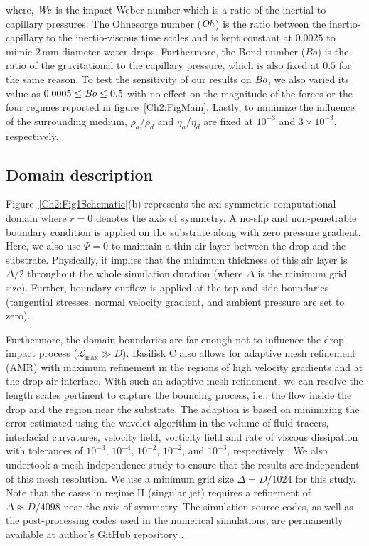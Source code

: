 \begin{subappendices}
	where, $\mathit{We}$ is the impact Weber number which is a ratio of the inertial to capillary pressures. The Ohnesorge number ($\mathit{Oh}$) is the ratio between the inertio-capillary to the inertio-viscous time scales and is kept constant at $0.0025$ to mimic $2\,\si{\milli\meter}$ diameter water drops. Furthermore, the Bond number ($Bo$) is the ratio of the gravitational to the capillary pressure, which is also fixed at $0.5$ for the same reason. To test the sensitivity of our results on $\mathit{Bo}$, we also varied its value as $0.0005 \le \mathit{Bo} \le  0.5$ with no effect on the magnitude of the forces or the four regimes reported in figure~\ref{Ch2:FigMain}. Lastly, to minimize the influence of the surrounding medium, $\rho_a/\rho_d$ and $\eta_a/\eta_d$ are fixed at $10^{-3}$ and $3 \times 10^{-3}$, respectively. 
	
	\subsection{Domain description}
	
	Figure~\ref{Ch2:Fig1Schematic}(b) represents the axi-symmetric computational domain where $r = 0$ denotes the axis of symmetry. A no-slip and non-penetrable boundary condition is applied on the substrate along with zero pressure gradient. Here, we also use $\Psi = 0$ to maintain a thin air layer between the drop and the substrate. Physically, it implies that the minimum thickness of this air layer is $\Delta/2$ throughout the whole simulation duration (where $\Delta$ is the minimum grid size). Further, boundary outflow is applied at the top and side boundaries (tangential stresses, normal velocity gradient, and ambient pressure are set to zero). 
	
	Furthermore, the domain boundaries are far enough not to influence the drop impact process ($\mathcal{L}_{\text{max}} \gg D$). Basilisk C \cite{basiliskpopinet1} also allows for adaptive mesh refinement (AMR) with maximum refinement in the regions of high velocity gradients and at the drop-air interface. With such an adaptive mesh refinement, we can resolve the length scales pertinent to capture the bouncing process, i.e., the flow inside the drop and the region near the substrate. The adaption is based on minimizing the error estimated using the wavelet algorithm \citep{popinet2015quadtree} in the volume of fluid tracers, interfacial curvatures, velocity field, vorticity field and rate of viscous dissipation with tolerances of $10^{-3}$, $10^{-4}$, $10^{-2}$, $10^{-2}$, and $10^{-3}$, respectively  \citep{basiliskvatsaltwopeaks}. We also undertook a mesh independence study to ensure that the results are independent of this mesh resolution. We use a minimum grid size $\Delta = D/1024$ for this study. Note that the cases in regime II (singular jet) requires a refinement of $\Delta \approx D/4098$ near the axis of symmetry. The simulation source codes, as well as the post-processing codes used in the numerical simulations, are permanently available at author's GitHub repository \cite{basiliskvatsaltwopeaks}. 
	

\end{subappendices}
